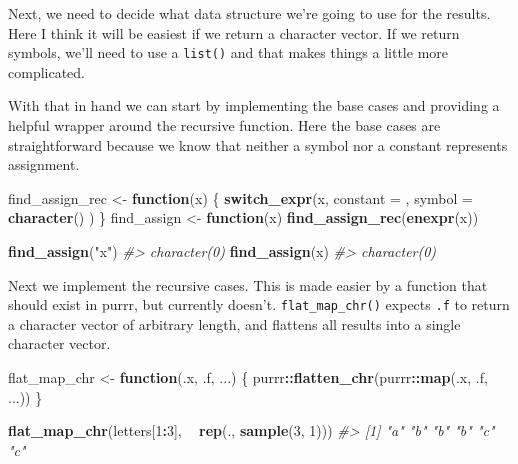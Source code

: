 \documentclass[]{book}
\newenvironment{Shaded}{\begin{snugshade}}{\end{snugshade}}
\newcommand{\CommentTok}[1]{\textcolor[rgb]{0.37,0.37,0.37}{\textit{#1}}}
\newcommand{\ControlFlowTok}[1]{\textcolor[rgb]{0.27,0.27,0.27}{\textbf{#1}}}
\newcommand{\DataTypeTok}[1]{\textcolor[rgb]{0.27,0.27,0.27}{#1}}
\newcommand{\DecValTok}[1]{\textcolor[rgb]{0.06,0.06,0.06}{#1}}
\newcommand{\KeywordTok}[1]{\textcolor[rgb]{0.27,0.27,0.27}{\textbf{#1}}}
\newcommand{\NormalTok}[1]{#1}
\newcommand{\OperatorTok}[1]{\textcolor[rgb]{0.43,0.43,0.43}{\textbf{#1}}}
\newcommand{\StringTok}[1]{\textcolor[rgb]{0.5,0.5,0.5}{#1}}
\begin{document}
Next, we need to decide what data structure we're going to use for the results. Here I think it will be easiest if we return a character vector. If we return symbols, we'll need to use a \texttt{list()} and that makes things a little more complicated.

With that in hand we can start by implementing the base cases and providing a helpful wrapper around the recursive function. Here the base cases are straightforward because we know that neither a symbol nor a constant represents assignment.

\begin{Shaded}
\begin{Highlighting}[]
\NormalTok{find_assign_rec <-}\StringTok{ }\ControlFlowTok{function}\NormalTok{(x) \{}
  \KeywordTok{switch_expr}\NormalTok{(x,}
    \DataTypeTok{constant =}\NormalTok{ ,}
    \DataTypeTok{symbol =} \KeywordTok{character}\NormalTok{()}
\NormalTok{  )}
\NormalTok{\}}
\NormalTok{find_assign <-}\StringTok{ }\ControlFlowTok{function}\NormalTok{(x) }\KeywordTok{find_assign_rec}\NormalTok{(}\KeywordTok{enexpr}\NormalTok{(x))}

\KeywordTok{find_assign}\NormalTok{(}\StringTok{"x"}\NormalTok{)}
\CommentTok{#> character(0)}
\KeywordTok{find_assign}\NormalTok{(x)}
\CommentTok{#> character(0)}
\end{Highlighting}
\end{Shaded}

Next we implement the recursive cases. This is made easier by a function that should exist in purrr, but currently doesn't. \texttt{flat\_map\_chr()} expects \texttt{.f} to return a character vector of arbitrary length, and flattens all results into a single character vector.

\begin{Shaded}
\begin{Highlighting}[]
\NormalTok{flat_map_chr <-}\StringTok{ }\ControlFlowTok{function}\NormalTok{(.x, .f, ...) \{}
\NormalTok{  purrr}\OperatorTok{::}\KeywordTok{flatten_chr}\NormalTok{(purrr}\OperatorTok{::}\KeywordTok{map}\NormalTok{(.x, .f, ...))}
\NormalTok{\}}

\KeywordTok{flat_map_chr}\NormalTok{(letters[}\DecValTok{1}\OperatorTok{:}\DecValTok{3}\NormalTok{], }\OperatorTok{~}\StringTok{ }\KeywordTok{rep}\NormalTok{(., }\KeywordTok{sample}\NormalTok{(}\DecValTok{3}\NormalTok{, }\DecValTok{1}\NormalTok{)))}
\CommentTok{#> [1] "a" "b" "b" "b" "c" "c"}
\end{Highlighting}
\end{Shaded}
\end{document}
